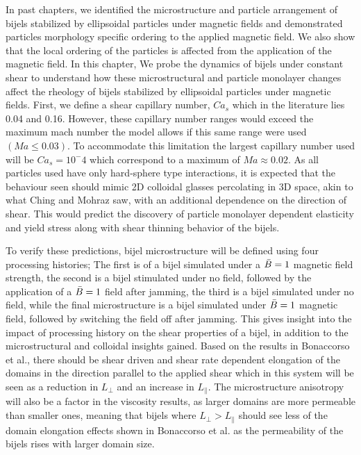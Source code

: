 In past chapters, we identified the microstructure and particle arrangement of bijels stabilized by ellipsoidal particles under magnetic fields and demonstrated
particles morphology specific ordering to the applied magnetic field. We also show that the local ordering of the particles is affected from the application of
the magnetic field. In this chapter, We probe the dynamics of bijels under constant shear to understand how these microstructural and particle monolayer changes
affect the rheology of bijels stabilized by ellipsoidal particles under magnetic fields. First, we define a shear capillary number, $Ca_s$
which in the literature lies 0.04 and 0.16. \cite{frijters_effects_2012, yang_capillary_2022}
However, these capillary number ranges would exceed the 
maximum mach number the model allows if this same range were used $(Ma \leq 0.03)$. To accommodate this limitation the 
largest capillary number used will be $Ca_s = 10^-4$ which correspond to a maximum of $Ma \approx 0.02$. As all particles used 
have only hard-sphere type interactions, it is expected that the behaviour seen should mimic 2D colloidal glasses 
percolating in 3D space, akin to what Ching and Mohraz saw, with an additional dependence on the direction of shear. 
This would predict the discovery of particle monolayer dependent elasticity and yield stress along with shear thinning 
behavior of the bijels.

To verify these predictions, bijel microstructure will be defined using four processing histories; The first is of a 
bijel simulated under a $\Bar{B} = 1$ magnetic field strength, the second is a bijel stimulated under no field, 
followed by the application of a $\Bar{B} = 1$ field after jamming, the third is a bijel simulated under no field, 
while the final microstructure is a bijel simulated under $\Bar{B} = 1$ magnetic field, followed by switching the 
field off after jamming. This gives insight into the impact of processing history on the shear properties of a bijel, 
in addition to the microstructural and colloidal insights gained. Based on the results in Bonaccorso et al., there 
should be shear driven and shear rate dependent elongation of the domains in the direction parallel to the applied 
shear which in this system will be seen as a reduction in $L_{\perp}$ and an increase in $L_{\parallel}$. 
\cite{bonaccorso_shear_2020} The microstructure anisotropy will also be a factor in the viscosity results, as 
larger domains are more permeable than smaller ones, meaning that bijels where $L_{\perp} > L_{\parallel}$ should 
see less of the domain elongation effects shown in Bonaccorso et al. as the permeability of the bijels rises with 
larger domain size. \cite{bonaccorso_shear_2020}

